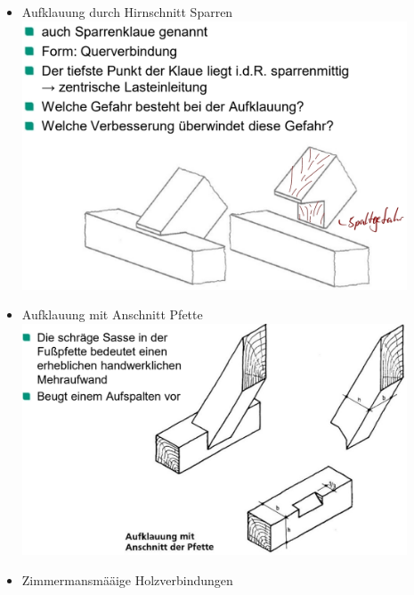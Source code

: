 \documentclass[fleqn,twoside]{article}
\begin{document}
    \begin{minipage}{0.45\textwidth}
        \begin{itemize}
                    \item Aufklauung durch Hirnschnitt Sparren\\
                        \includegraphics[width=0.9\textwidth]{Grafiken/Zimmermansmaessige Verbindungen/Verbindungsarten/Aufklauung durch Hirnschnitt Sparren.jpg}\\
                    \item Aufklauung mit Anschnitt Pfette\\
                        \includegraphics[width=0.9\textwidth]{Grafiken/Zimmermansmaessige Verbindungen/Verbindungsarten/Aufklauung mit Anschnitt Pfette.jpg}\\
                    \item Zimmermansmääige Holzverbindungen\\

\end{itemize}
\end{minipage}
\end{document}
